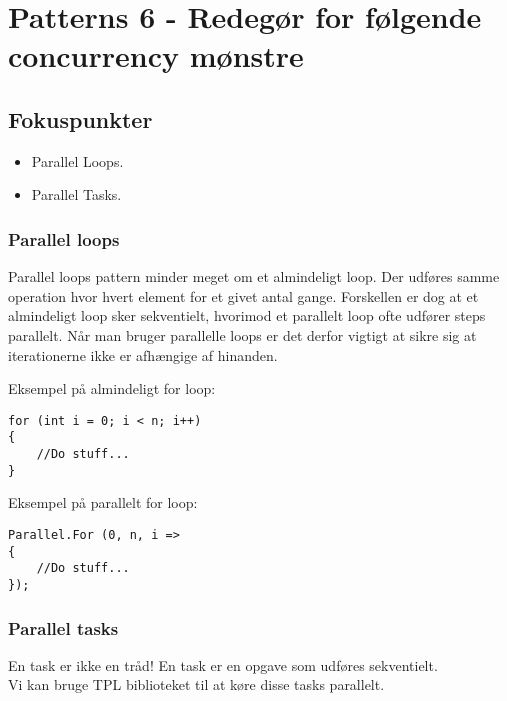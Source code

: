 \section{Patterns 6 - Redegør for følgende concurrency mønstre}

\subsection{Fokuspunkter}

\begin{itemize}
	\item Parallel Loops.
	\item Parallel Tasks.
\end{itemize}

\subsubsection{Parallel loops}

Parallel loops pattern minder meget om et almindeligt loop. Der udføres samme operation hvor hvert element for et givet antal gange. Forskellen er dog at et almindeligt loop sker sekventielt, hvorimod et parallelt loop ofte udfører steps parallelt. Når man bruger parallelle loops er det derfor vigtigt at sikre sig at iterationerne ikke er afhængige af hinanden.

Eksempel på almindeligt for loop:

\begin{lstlisting}[caption=Normal for loop, label=code:normalLoop]
for (int i = 0; i < n; i++)
{
	//Do stuff...
}
\end{lstlisting}

Eksempel på parallelt for loop:

\begin{lstlisting}[caption=Parallel for loop, label=code:paraLoop]
Parallel.For (0, n, i =>
{
	//Do stuff...
});
\end{lstlisting}

\subsubsection{Parallel tasks}

En task er ikke en tråd! En task er en opgave som udføres sekventielt.\\

Vi kan bruge TPL biblioteket til at køre disse tasks parallelt.
